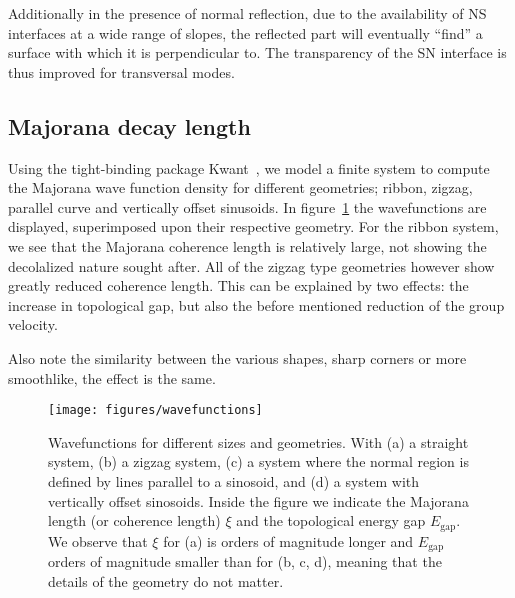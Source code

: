 			Additionally in the presence of normal reflection, due to the availability of NS interfaces at a wide range of slopes, the reflected part will eventually ``find'' a surface with which it is perpendicular to. The transparency of the SN interface is thus improved for transversal modes.

		\subsection{Majorana decay length}

			Using the tight-binding package Kwant~\cite{groth_kwant:_2014}, we model a finite system to compute the Majorana wave function density for different geometries; ribbon, zigzag, parallel curve and vertically offset sinusoids.
			In figure~\ref{fig:wavefunctions} the wavefunctions are displayed, superimposed upon their respective geometry.
			For the ribbon system, we see that the Majorana coherence length is relatively large, not showing the decolalized nature sought after.
			All of the zigzag type geometries however show greatly reduced coherence length.
			This can be explained by two effects: the increase in topological gap, but also the before mentioned reduction of the group velocity.

			Also note the similarity between the various shapes, sharp corners or more smoothlike, the effect is the same.

			\begin{figure}[!htb]
			\centering
			\texttt{[image: figures/wavefunctions]}
			\caption{Wavefunctions for different sizes and geometries.
			With (a) a straight system, (b) a zigzag system, (c) a system where the normal region is defined by lines parallel to a sinosoid, and (d) a system with vertically offset sinosoids.
			Inside the figure we indicate the Majorana length (or coherence length) $\xi$ and the topological energy gap $E_\textrm{gap}.$
			We observe that $\xi$ for (a) is orders of magnitude longer and $E_\textrm{gap}$ orders of magnitude smaller than for (b, c, d), meaning that the details of the geometry do not matter.
			\label{fig:wavefunctions}}
			\end{figure}

